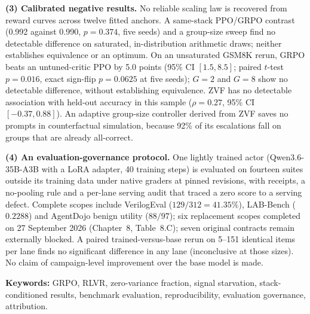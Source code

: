 \textbf{(3) Calibrated negative results.} No reliable scaling law is recovered
from reward curves across twelve fitted anchors. A same-stack PPO/GRPO
contrast (0.992 against 0.990, $p = 0.374$, five seeds) and a group-size sweep
find no detectable difference on saturated, in-distribution arithmetic draws;
neither establishes equivalence or an optimum. On an unsaturated GSM8K rerun, GRPO beats an
untuned-critic PPO by 5.0 points (95\% CI $[1.5, 8.5]$; paired $t$-test
$p=0.016$, exact sign-flip $p=0.0625$ at five seeds); $G = 2$ and $G = 8$
show no detectable difference, without establishing equivalence. ZVF has no
detectable association with held-out accuracy in this sample
($\rho = 0.27$, 95\% CI $[-0.37, 0.88]$). An adaptive group-size controller
derived from ZVF saves no prompts in counterfactual simulation, because 92\% of its escalations fall on
groups that are already all-correct.

\textbf{(4) An evaluation-governance protocol.} One lightly trained actor
(Qwen3.6-35B-A3B with a LoRA adapter, 40 training steps) is evaluated on
fourteen suites outside its training data under native graders at pinned revisions, with
receipts, a no-pooling rule and a per-lane serving audit that traced a
zero score to a serving defect. Complete scopes include VerilogEval
($129/312 = 41.35\%$), LAB-Bench ($0.2288$) and AgentDojo benign utility
($88/97$); six replacement scopes completed on 27 September 2026
(Chapter~8, Table~8.C); seven original contracts remain externally blocked. A
paired trained-versus-base rerun on 5--151 identical items per lane finds no
significant difference in any lane (inconclusive at those sizes). No
claim of campaign-level improvement over the base model is made.

\vspace{0.25in}
\noindent\textbf{Keywords:} GRPO, RLVR, zero-variance fraction, signal
starvation, stack-conditioned results, benchmark evaluation, reproducibility,
evaluation governance, attribution.

\tableofcontents
\listoffigures
\listoftables
